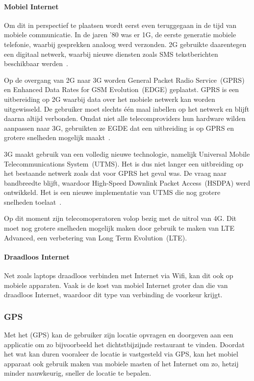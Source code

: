 \paragraph{Mobiel Internet}
Om dit in perspectief te plaatsen wordt eerst even teruggegaan in de tijd van mobiele communicatie.
In de jaren '80 was er 1G, de eerste generatie mobiele telefonie, waarbij gesprekken analoog werd verzonden.
2G gebruikte daarentegen een digitaal netwerk, waarbij nieuwe diensten zoals SMS tekstberichten beschikbaar werden~\cite{Miami2008}.

Op de overgang van 2G naar 3G worden General Packet Radio Service~(GPRS) en Enhanced Data Rates for GSM Evolution~(EDGE) geplaatst.
GPRS is een uitbereiding op 2G waarbij data over het mobiele netwerk kan worden uitgewisseld.
De gebruiker moet slechts één maal inbellen op het netwerk en blijft daarna altijd verbonden.
Omdat niet alle telecomproviders hun hardware wilden aanpassen naar 3G, gebruikten ze EGDE dat een uitbreiding is op GPRS en grotere snelheden mogelijk maakt~\cite{Lauwers2007}.

3G maakt gebruik van een volledig nieuwe technologie, namelijk Universal Mobile Telecommunications System~(UTMS).
Het is dus niet langer een uitbreiding op het bestaande netwerk zoals dat voor GPRS het geval was.
De vraag naar bandbreedte blijft, waardoor High-Speed Downlink Packet Access~(HSDPA) werd ontwikkeld. 
Het is een nieuwe implementatie van UTMS die nog grotere snelheden toelaat~\cite{Lauwers2007}.

Op dit moment zijn telecomoperatoren volop bezig met de uitrol van 4G.
Dit moet nog grotere snelheden mogelijk maken door gebruik te maken van LTE Advanced, een verbetering van Long Term Evolution~(LTE).

\paragraph{Draadloos Internet}
Net zoals laptops draadloos verbinden met Internet via Wifi, kan dit ook op mobiele apparaten.
Vaak is de kost van mobiel Internet groter dan die van draadloos Internet, waardoor dit type van verbinding de voorkeur krijgt.

\subsubsection{GPS}
Met het  (GPS) kan de gebruiker zijn locatie opvragen en doorgeven aan een applicatie om zo bijvoorbeeld het dichtstbijzijnde restaurant te vinden. 
Doordat het wat kan duren vooraleer de locatie is vastgesteld via GPS, kan het mobiel apparaat ook gebruik maken van mobiele masten of het Internet om zo, hetzij minder nauwkeurig, sneller de locatie te bepalen.

